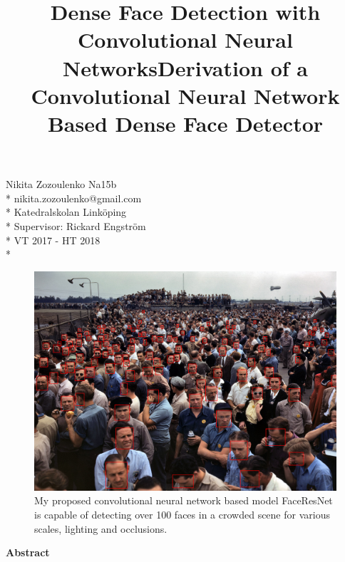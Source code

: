 \documentclass[a4paper,11pt,twoside]{article}
\title{Dense Face Detection with Convolutional Neural Networks}
\title{Derivation of a Convolutional Neural Network Based Dense Face Detector}
\date{}
\begin{document}
\maketitle

\begin{center}
Nikita Zozoulenko Na15b \\*
nikita.zozoulenko@gmail.com \\*
Katedralskolan Linköping\\*
Supervisor: Rickard Engström \\*
VT 2017 - HT 2018 \\*
\end{center}


\vfill
\begin{figure}[h]
	\centering
  		\includegraphics[scale=0.322]{crowd.jpg}
  	\caption{My proposed convolutional neural network based model FaceResNet is capable of detecting over 100 faces in a crowded scene for various scales, lighting and occlusions.} \label{crowd}
\end{figure}
\vfill

\newpage

\Large{\textbf{Abstract}}\\
\end{document}
